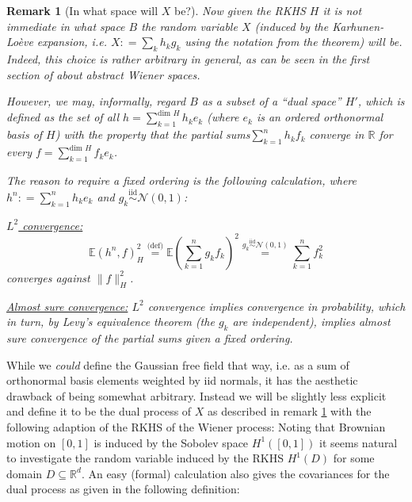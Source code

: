 \documentclass[11pt,reqno]{amsart}
\numberwithin{equation}{section}
\newtheorem{rem}[thm]{Remark}
\newcommand{\eqby}[1]{\mathrel{\stackrel{#1}{=}}}
\newcommand{\eqbydef}{\mathrel{\stackrel{\text{(def)}}{=}}}
\newcommand{\deq}{\mathrel{\mathop:}=}
\newcommand{\iidnormal}{\mathrel{\stackrel{\text{iid}}{\sim}}\mathcal N(0,1)}
\begin{document}
\begin{rem}[In what space will $X$ be?]\label{rem:spaceofX}
	Now given the RKHS $H$ it is not immediate in what space $B$ the random variable $X$ (induced by the Karhunen-Lo\`eve expansion, i.e. $X\deq \sum_k h_kg_k$ using the notation from the theorem) will be. Indeed, this choice is rather arbitrary in general, as can be seen in the first section of \cite{She07} about abstract Wiener spaces.
	
	However, we may, informally, regard $B$ as a subset of a ``dual space'' $H'$, which is defined as the set of all $h=\sum_{k=1}^{\text{dim }H}h_ke_k$ (where $e_k$ is an \emph{ordered} orthonormal basis of $H$) with the property that the partial sums$\sum_{k=1}^n h_kf_k$ converge in $\mathbb R$ for every $f=\sum_{k=1}^{\text{dim }H}f_ke_k$.
	
	The reason to require a fixed ordering is the following calculation, where $h^n\deq \sum_{k=1}^n h_ke_k$ and $g_k\iidnormal$:
	
	\underline{$L^2$ convergence:}
	$$\mathbb E(h^n,f)_H^2 \eqbydef \mathbb E(\sum_{k=1}^n g_k f_k)^2 \eqby{g_k\iidnormal} \sum_{k=1}^n f_k^2$$ converges against $\|f\|_H^2$.
	
	\underline{Almost sure convergence:} $L^2$ convergence implies convergence in probability, which in turn, by Levy's equivalence theorem (the $g_k$ are independent), implies almost sure convergence of the \emph{partial sums} given a fixed ordering.
	
\end{rem}

While we \emph{could} define the Gaussian free field that way, i.e. as a sum of orthonormal basis elements weighted by iid normals, it has the aesthetic drawback of being somewhat arbitrary. Instead we will be slightly less explicit and define it to be the dual process of $X$ as described in remark \ref{rem:spaceofX} with the following adaption of the RKHS of the Wiener process: Noting that Brownian motion on $[0,1]$ is induced by the Sobolev space $H^1([0,1])$ it seems natural to investigate the random variable induced by the RKHS $H^1(D)$ for some domain $D\subseteq\mathbb R^d$. An easy (formal) calculation also gives the covariances for the dual process as given in the following definition:
\end{document}
